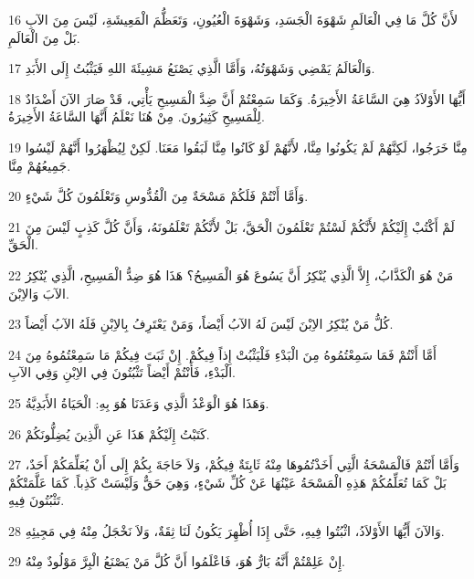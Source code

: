 \par 16 لأَنَّ كُلَّ مَا فِي الْعَالَمِ شَهْوَةَ الْجَسَدِ، وَشَهْوَةَ الْعُيُونِ، وَتَعَظُّمَ الْمَعِيشَةِ، لَيْسَ مِنَ الآبِ بَلْ مِنَ الْعَالَمِ.
\par 17 وَالْعَالَمُ يَمْضِي وَشَهْوَتُهُ، وَأَمَّا الَّذِي يَصْنَعُ مَشِيئَةَ اللهِ فَيَثْبُتُ إِلَى الأَبَدِ.
\par 18 أَيُّهَا الأَوْلاَدُ هِيَ السَّاعَةُ الأَخِيرَةُ. وَكَمَا سَمِعْتُمْ أَنَّ ضِدَّ الْمَسِيحِ يَأْتِي، قَدْ صَارَ الآنَ أَضْدَادٌ لِلْمَسِيحِ كَثِيرُونَ. مِنْ هُنَا نَعْلَمُ أَنَّهَا السَّاعَةُ الأَخِيرَةُ.
\par 19 مِنَّا خَرَجُوا، لَكِنَّهُمْ لَمْ يَكُونُوا مِنَّا، لأَنَّهُمْ لَوْ كَانُوا مِنَّا لَبَقُوا مَعَنَا. لَكِنْ لِيُظْهَرُوا أَنَّهُمْ لَيْسُوا جَمِيعُهُمْ مِنَّا.
\par 20 وَأَمَّا أَنْتُمْ فَلَكُمْ مَسْحَةٌ مِنَ الْقُدُّوسِ وَتَعْلَمُونَ كُلَّ شَيْءٍ.
\par 21 لَمْ أَكْتُبْ إِلَيْكُمْ لأَنَّكُمْ لَسْتُمْ تَعْلَمُونَ الْحَقَّ، بَلْ لأَنَّكُمْ تَعْلَمُونَهُ، وَأَنَّ كُلَّ كَذِبٍ لَيْسَ مِنَ الْحَقِّ.
\par 22 مَنْ هُوَ الْكَذَّابُ، إِلاَّ الَّذِي يُنْكِرُ أَنَّ يَسُوعَ هُوَ الْمَسِيحُ؟ هَذَا هُوَ ضِدُّ الْمَسِيحِ، الَّذِي يُنْكِرُ الآبَ وَالاِبْنَ.
\par 23 كُلُّ مَنْ يُنْكِرُ الاِبْنَ لَيْسَ لَهُ الآبُ أَيْضاً، وَمَنْ يَعْتَرِفُ بِالاِبْنِ فَلَهُ الآبُ أَيْضاً.
\par 24 أَمَّا أَنْتُمْ فَمَا سَمِعْتُمُوهُ مِنَ الْبَدْءِ فَلْيَثْبُتْ إِذاً فِيكُمْ. إِنْ ثَبَتَ فِيكُمْ مَا سَمِعْتُمُوهُ مِنَ الْبَدْءِ، فَأَنْتُمْ أَيْضاً تَثْبُتُونَ فِي الاِبْنِ وَفِي الآبِ.
\par 25 وَهَذَا هُوَ الْوَعْدُ الَّذِي وَعَدَنَا هُوَ بِهِ: الْحَيَاةُ الأَبَدِيَّةُ.
\par 26 كَتَبْتُ إِلَيْكُمْ هَذَا عَنِ الَّذِينَ يُضِلُّونَكُمْ.
\par 27 وَأَمَّا أَنْتُمْ فَالْمَسْحَةُ الَّتِي أَخَذْتُمُوهَا مِنْهُ ثَابِتَةٌ فِيكُمْ، وَلاَ حَاجَةَ بِكُمْ إِلَى أَنْ يُعَلِّمَكُمْ أَحَدٌ، بَلْ كَمَا تُعَلِّمُكُمْ هَذِهِ الْمَسْحَةُ عَيْنُهَا عَنْ كُلِّ شَيْءٍ، وَهِيَ حَقٌّ وَلَيْسَتْ كَذِباً. كَمَا عَلَّمَتْكُمْ تَثْبُتُونَ فِيهِ.
\par 28 وَالآنَ أَيُّهَا الأَوْلاَدُ، اثْبُتُوا فِيهِ، حَتَّى إِذَا أُظْهِرَ يَكُونُ لَنَا ثِقَةٌ، وَلاَ نَخْجَلُ مِنْهُ فِي مَجِيئِهِ.
\par 29 إِنْ عَلِمْتُمْ أَنَّهُ بَارٌّ هُوَ، فَاعْلَمُوا أَنَّ كُلَّ مَنْ يَصْنَعُ الْبِرَّ مَوْلُودٌ مِنْهُ.

